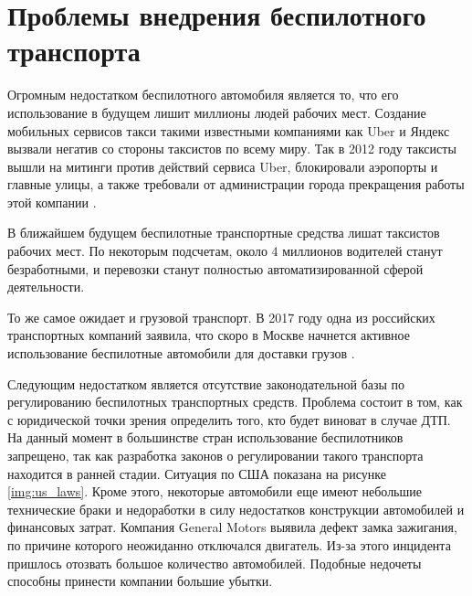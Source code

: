 

\section{Проблемы внедрения беспилотного транспорта} \label{sect3_Implementation}

Огромным недостатком беспилотного автомобиля является то, что его использование в
будущем лишит миллионы людей рабочих мест. Создание мобильных сервисов такси такими
известными компаниями как Uber и Яндекс вызвали негатив со стороны таксистов по всему
миру. Так в 2012 году таксисты вышли на митинги против действий сервиса Uber,
блокировали аэропорты и главные улицы, а также требовали от администрации города
прекращения работы этой компании \cite{Plus&Minus}.

В ближайшем будущем беспилотные транспортные средства лишат таксистов рабочих
мест. По некоторым подсчетам, около 4 миллионов водителей станут безработными, и
перевозки станут полностью автоматизированной сферой деятельности.

То же самое ожидает и грузовой транспорт. В 2017 году одна из российских
транспортных компаний заявила, что скоро в Москве начнется активное использование
беспилотные автомобили для доставки грузов \cite{Pilotless_Economics}.

Следующим недостатком является отсутствие законодательной базы по регулированию
беспилотных транспортных средств. Проблема состоит в том, как с юридической точки
зрения определить того, кто будет виноват в случае ДТП. На данный момент в большинстве
стран использование беспилотников запрещено, так как разработка законов о регулировании
такого транспорта находится в ранней стадии. Ситуация по США показана на
рисунке \ref{img:us_laws}. Кроме этого, некоторые автомобили еще
имеют небольшие технические браки и недоработки в силу недостатков конструкции
автомобилей и финансовых затрат. Компания General Motors выявила дефект замка
зажигания, по причине которого неожиданно отключался двигатель. Из-за этого инцидента
пришлось отозвать большое количество автомобилей. Подобные недочеты способны
принести компании большие убытки.

